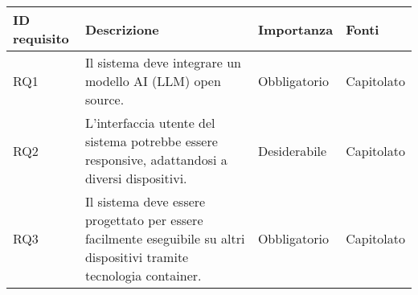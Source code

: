 \begin{table}[H]
    \begin{tabular}{|C{2.7cm}|L{7.2cm}|C{2.7cm}|C{2cm}|}
        \hline
        \textbf{ID requisito} & \textbf{Descrizione} & \textbf{Importanza} & \textbf{Fonti}  \\
        \hline
        RQ1 & Il sistema deve integrare un modello AI (LLM) open source. & Obbligatorio & Capitolato \\
        \hline
        RQ2 & L'interfaccia utente del sistema potrebbe essere responsive, adattandosi a diversi dispositivi. & Desiderabile & Capitolato \\
        \hline
        RQ3 & Il sistema deve essere progettato per essere facilmente eseguibile su altri dispositivi tramite tecnologia container. & Obbligatorio & Capitolato \\
        \hline
        \end{tabular}

\end{table}